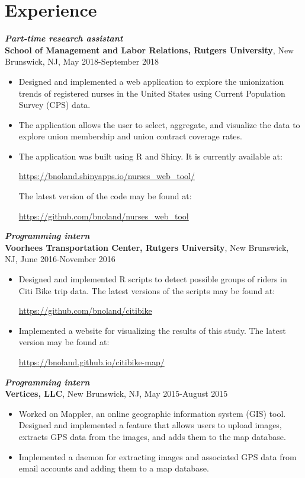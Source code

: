 \documentclass[12pt]{article}
\begin{document}
\section*{Experience}
\textit{\textbf{Part-time research assistant}} \\
\textbf{School of Management and Labor Relations, Rutgers University}, New Brunswick, NJ, May 
2018-September 2018
\begin{itemize}
\item
Designed and implemented a web application to explore the unionization trends of registered 
nurses in the United States using Current Population Survey (CPS) data.
\item
The application allows the user to select, aggregate, and visualize the data to explore union 
membership and union contract coverage rates.
\item
The application was built using R and Shiny. It is currently available at:
\begin{center}
\url{https://bnoland.shinyapps.io/nurses_web_tool/}
\end{center}
The latest version of the code may be found at:
\begin{center}
\url{https://github.com/bnoland/nurses_web_tool}
\end{center}
\end{itemize}

\textit{\textbf{Programming intern}} \\
\textbf{Voorhees Transportation Center, Rutgers University}, New Brunswick, NJ, June 2016-November 
2016
\begin{itemize}
\item
Designed and implemented R scripts to detect possible groups of riders in Citi Bike trip data. The 
latest versions of the scripts may be found at:
\begin{center}
\url{https://github.com/bnoland/citibike}
\end{center}

\item
Implemented a website for visualizing the results of this study. The latest version may be found at:
\begin{center}
\url{https://bnoland.github.io/citibike-map/}
\end{center}

\end{itemize}

\textit{\textbf{Programming intern}} \\
\textbf{Vertices, LLC}, New Brunswick, NJ, May 2015-August 2015
\begin{itemize}
\item
Worked on Mappler, an online geographic information system (GIS) tool. Designed and implemented a 
feature that allows users to upload images, extracts GPS data from the images, and adds them to the 
map database.
\item
Implemented a daemon for extracting images and associated GPS data from email accounts and adding 
them to a map database.
\end{itemize}
\end{document}

